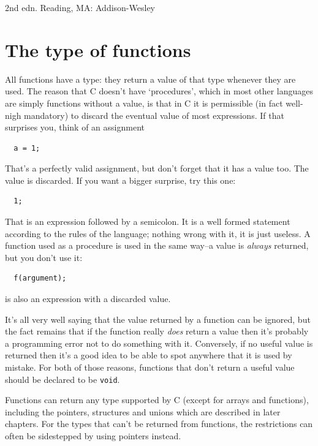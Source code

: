  2nd edn.
     Reading, MA: Addison-Wesley


        \section{The type of functions}
        

  

  All functions have a type: they return a value of that type whenever
   they are used. The reason that C doesn't have `procedures', which
   in most other languages are simply functions without a value, is that in
   C it is permissible (in fact well-nigh mandatory) to discard the eventual
   value of most expressions. If that surprises you, think of an
   assignment

\begin{Verbatim}
  a = 1;
\end{Verbatim}

  That's a perfectly valid assignment, but don't forget that it has a
   value too. The value is discarded. If you want a bigger surprise, try
   this one:

\begin{Verbatim}
  1;
\end{Verbatim}

  That is an expression followed by a semicolon. It is a well formed
   statement according to the rules of the language; nothing wrong with it,
   it is just useless. A function used as a procedure is used in the same
   way--a value is \textit{always} returned, but you don't use it:

\begin{Verbatim}
  f(argument);
\end{Verbatim}

  is also an expression with a discarded value.


  It's all very well saying that the value returned by a function can be
   ignored, but the fact remains that if the function really \textit{does}
   return a value then it's probably a programming error not to do something
   with it. Conversely, if no useful value is returned then it's a good idea
   to be able to spot anywhere that it is used by mistake. For both of those
   reasons, functions that don't return a useful value should be declared to
   be \texttt{void}.


  Functions can return any type supported by C (except for arrays and
   functions), including the pointers, structures and unions which are
   described in later chapters. For the types that can't be returned from
   functions, the restrictions can often be sidestepped by using pointers
   instead.


